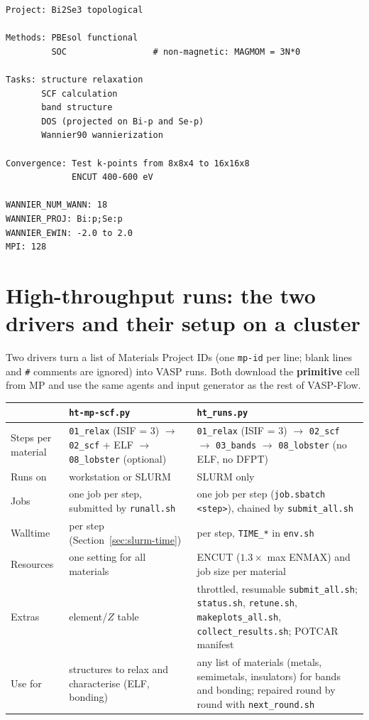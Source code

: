 \documentclass[11pt,a4paper]{scrartcl}
\newcommand{\thead}{\rowcolor{lightblue}}
\begin{document}
\begin{lstlisting}
Project: Bi2Se3 topological

Methods: PBEsol functional
         SOC                 # non-magnetic: MAGMOM = 3N*0

Tasks: structure relaxation
       SCF calculation
       band structure
       DOS (projected on Bi-p and Se-p)
       Wannier90 wannierization

Convergence: Test k-points from 8x8x4 to 16x16x8
             ENCUT 400-600 eV

WANNIER_NUM_WANN: 18
WANNIER_PROJ: Bi:p;Se:p
WANNIER_EWIN: -2.0 to 2.0
MPI: 128
\end{lstlisting}

\section{High-throughput runs: the two drivers and their setup on a cluster}
\label{sec:highthroughput}

Two drivers turn a list of Materials Project IDs (one \texttt{mp-id} per
line; blank lines and \texttt{\#} comments are ignored) into VASP runs.  Both
download the \textbf{primitive} cell from MP and use the same agents and
input generator as the rest of VASP-Flow.

\begin{tabularx}{\linewidth}{@{}lXX@{}}
\thead
 & \texttt{ht-mp-scf.py} & \texttt{ht\_runs.py} \\ \midrule
Steps per material & \texttt{01\_relax} (ISIF = 3) $\to$ \texttt{02\_scf}
  + ELF $\to$ \texttt{08\_lobster} (optional) &
  \texttt{01\_relax} (ISIF = 3) $\to$ \texttt{02\_scf} $\to$
  \texttt{03\_bands} $\to$ \texttt{08\_lobster} (no ELF, no DFPT) \\
Runs on & workstation or SLURM & SLURM only \\
Jobs & one job per step, submitted by \texttt{runall.sh} &
  one job per step (\texttt{job.sbatch <step>}), chained by
  \texttt{submit\_all.sh} \\
Walltime & per step (Section~\ref{sec:slurm-time}) & per step, \texttt{TIME\_*}
  in \texttt{env.sh} \\
Resources & one setting for all materials & ENCUT ($1.3\times$ max ENMAX)
  and job size per material \\
Extras & element/$Z$ table & throttled, resumable \texttt{submit\_all.sh};
  \texttt{status.sh}, \texttt{retune.sh}, \texttt{makeplots\_all.sh},
  \texttt{collect\_results.sh}; POTCAR manifest \\
Use for & structures to relax and characterise (ELF, bonding) &
  any list of materials (metals, semimetals, insulators) for bands and bonding; repaired
  round by round with \texttt{next\_round.sh} \\
\bottomrule
\end{tabularx}
\end{document}
